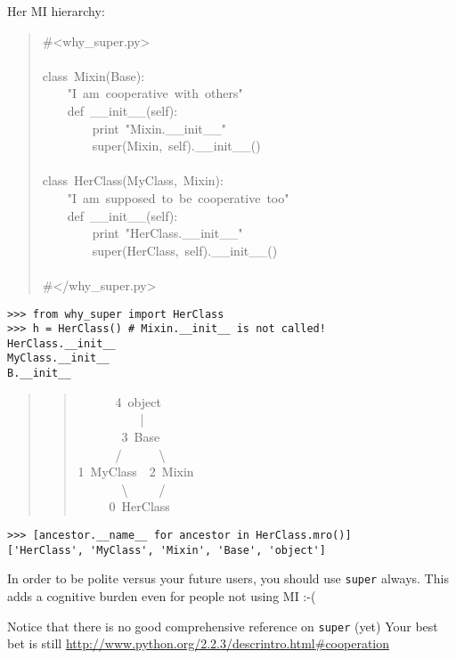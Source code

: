 \documentclass[10pt,a4paper,english]{article}
\begin{document}
Her MI hierarchy:
\begin{quote}{\ttfamily \raggedright \noindent
{\#}<why{\_}super.py>~\\
~\\
class~Mixin(Base):~\\
~~~~"I~am~cooperative~with~others"~\\
~~~~def~{\_}{\_}init{\_}{\_}(self):~\\
~~~~~~~~print~"Mixin.{\_}{\_}init{\_}{\_}"~\\
~~~~~~~~super(Mixin,~self).{\_}{\_}init{\_}{\_}()~\\
~\\
class~HerClass(MyClass,~Mixin):~\\
~~~~"I~am~supposed~to~be~cooperative~too"~\\
~~~~def~{\_}{\_}init{\_}{\_}(self):~\\
~~~~~~~~print~"HerClass.{\_}{\_}init{\_}{\_}"~\\
~~~~~~~~super(HerClass,~self).{\_}{\_}init{\_}{\_}()~\\
~\\
{\#}</why{\_}super.py>
}\end{quote}
\begin{verbatim}>>> from why_super import HerClass
>>> h = HerClass() # Mixin.__init__ is not called!
HerClass.__init__
MyClass.__init__
B.__init__\end{verbatim}
\begin{quote}
\begin{quote}{\ttfamily \raggedright \noindent
~~~~~~4~object~~~\\
~~~~~~~~~~|~\\
~~~~~~~3~Base~\\
~~~~~~/~~~~~~{\textbackslash}~\\
1~MyClass~~2~Mixin~\\
~~~~~~~{\textbackslash}~~~~~/~\\
~~~~~0~HerClass
}\end{quote}
\end{quote}
\begin{verbatim}>>> [ancestor.__name__ for ancestor in HerClass.mro()]
['HerClass', 'MyClass', 'Mixin', 'Base', 'object']\end{verbatim}

In order to be polite versus your future users, you should use \texttt{super} 
always. This adds a cognitive burden even for people not using MI :-(

Notice that there is no good comprehensive reference on \texttt{super} (yet)
Your best bet is still \href{http://www.python.org/2.2.3/descrintro.html\#cooperation}{http://www.python.org/2.2.3/descrintro.html{\#}cooperation}
\end{document}
